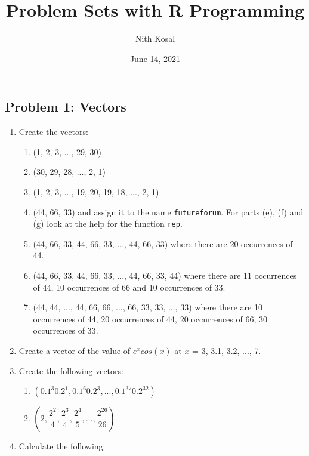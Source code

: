 \documentclass[11pt,a4paper]{article}
\author{Nith Kosal}
\title{Problem Sets with R Programming}
\date{June 14, 2021}
\begin{document}
	\maketitle
	
\subsection*{Problem 1: Vectors}	

\begin{enumerate}
	\item Create the vectors: 
	\begin{enumerate}
		\item (1, 2, 3, ..., 29, 30)
		\item (30, 29, 28, ..., 2, 1)
		\item (1, 2, 3, ..., 19, 20, 19, 18, ..., 2, 1)
		\item (44, 66, 33) and assign it to the name \texttt{futureforum}. 
		For parts (e), (f) and (g) look at the help for the function \texttt{rep}.
		
		\item (44, 66, 33, 44, 66, 33, ..., 44, 66, 33) where there are 20 occurrences of 44.
		\item (44, 66, 33, 44, 66, 33, ..., 44, 66, 33, 44) where there are 11 occurrences of 44, 10 occurrences of 66 and 10 occurrences of 33.
		\item (44, 44, ..., 44, 66, 66, ..., 66, 33, 33, ..., 33) where there are 10 occurrences of 44, 20 occurrences of 44, 20 occurrences of 66, 30 occurrences of 33. 
		
	\end{enumerate}
    \item Create a vector of the value of $e^{x}cos(x)$ at $x$ = 3, 3.1, 3.2, ..., 7.

    \item Create the following vectors: 
	\setlength\columnsep{0cm}
	
	\begin{multicols}{2}
		\begin{enumerate}
			\everymath{\displaystyle}  
			\item $(0.1^{3}0.2^{1}, 0.1^{6}0.2^{3}, ..., 0.1^{37}0.2^{32})$
			\item $(2, \dfrac{2^{2}}{4}, \dfrac{2^{3}}{4}, \dfrac{2^{4}}{5}, ..., \dfrac{2^{26}}{26})$ 
		\end{enumerate}
	\end{multicols}
	
	\item Calculate the following: 
	\setlength\columnsep{0cm}
	

\end{enumerate}
\end{document}

